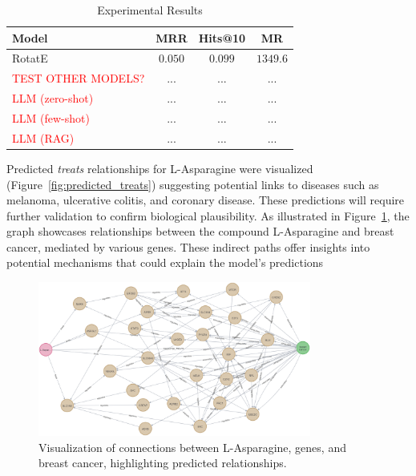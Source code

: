 \begin{table}[ht]
    \centering
    \caption{Experimental Results}
    \begin{tabular}{l c c c}
        \hline
        \textbf{Model}                      & \textbf{MRR} & \textbf{Hits@10} & \textbf{MR} \\
        \hline
        RotatE                              & $0.050$      & $0.099$          & $1349.6$    \\ %
        \textcolor{red}{TEST OTHER MODELS?} & $...$        & $...$            & $...$       \\
        \textcolor{red}{LLM (zero-shot)}    & $...$        & $...$            & $...$       \\
        \textcolor{red}{LLM (few-shot)}     & $...$        & $...$            & $...$       \\
        \textcolor{red}{LLM (RAG)}          & $...$        & $...$            & $...$       \\
        \hline
    \end{tabular}
    \label{tab:results}
\end{table}

Predicted \textit{treats} relationships for L-Asparagine were visualized (Figure~\ref{fig:predicted_treats}) suggesting potential links to diseases such as melanoma, ulcerative colitis, and coronary disease. These predictions will require further validation to confirm biological plausibility. As illustrated in Figure~\ref{fig:kg_visualization}, the graph showcases relationships between the compound L-Asparagine and breast cancer, mediated by various genes. These indirect paths offer insights into potential mechanisms that could explain the model's predictions

\begin{figure}[ht]
    \centering
    \includegraphics[width=0.8\textwidth]{images/pykeen/results.png}
    \caption{Visualization of connections between L-Asparagine, genes, and breast cancer, highlighting predicted relationships.}
    \label{fig:kg_visualization}
\end{figure}

